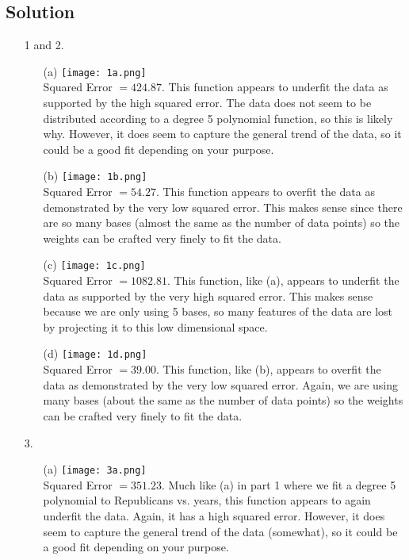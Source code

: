 \documentclass[submit]{harvardml}
\begin{document}
\subsection*{Solution}
\begin{enumerate}
    \item[1 and 2.] 
    \begin{enumerate}
        \item[(a)] \hspace\break\texttt{[image: 1a.png]}
        \\Squared Error $= 424.87$. This function appears to underfit the data as supported by the high squared error. The data does not seem to be distributed according to a degree 5 polynomial function, so this is likely why. However, it does seem to capture the general trend of the data, so it could be a good fit depending on your purpose.
        \item[(b)] \hspace\break\texttt{[image: 1b.png]}
        \\Squared Error $= 54.27$. This function appears to overfit the data as demonstrated by the very low squared error. This makes sense since there are so many bases (almost the same as the number of data points) so the weights can be crafted very finely to fit the data.
        \item[(c)] \hspace\break\texttt{[image: 1c.png]}
        \\Squared Error $= 1082.81$. This function, like (a), appears to underfit the data as supported by the very high squared error. This makes sense because we are only using 5 bases, so many features of the data are lost by projecting it to this low dimensional space.
        \item[(d)] \hspace\break\texttt{[image: 1d.png]}
        \\Squared Error $= 39.00$. This function, like (b), appears to overfit the data as demonstrated by the very low squared error. Again, we are using many bases (about the same as the number of data points) so the weights can be crafted very finely to fit the data.
    \end{enumerate}
    \item[3.]
    \begin{enumerate}
        \item[(a)] \hspace\break\texttt{[image: 3a.png]} 
        \\Squared Error $= 351.23$. Much like (a) in part 1 where we fit a degree 5 polynomial to Republicans vs. years, this function appears to again underfit the data. Again, it has a high squared error. However, it does seem to capture the general trend of the data (somewhat), so it could be a good fit depending on your purpose.

\end{enumerate}
\end{enumerate}
\end{document}
